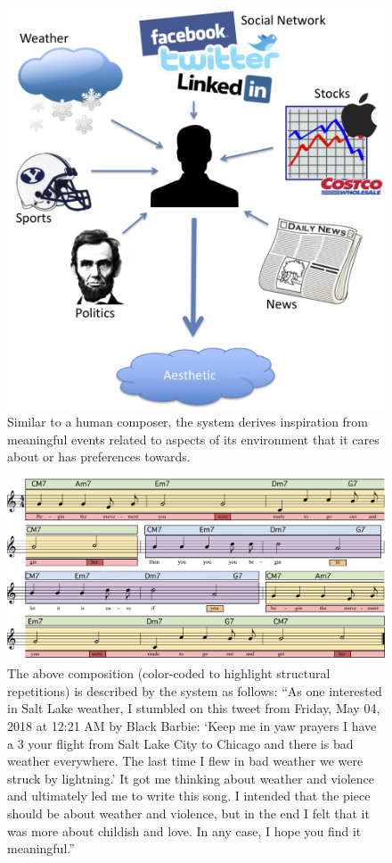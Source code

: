 \documentclass[letterpaper]{article}
\begin{document}
\begin{figure}[b!]
	\centering
	\includegraphics[width=.6\linewidth]{InspiringSources}
	\caption{\label{fig:inspiration} Similar to a human composer, the system derives inspiration from meaningful events related to aspects of its environment that it cares about or has preferences towards.}
\end{figure}

\begin{figure}[t!]
	\centering
	\includegraphics[width=.8\linewidth]{Song}
	\caption{\label{fig:song} The above composition (color-coded to highlight structural repetitions) is described by the system as follows: ``As one interested in Salt Lake weather, I stumbled on this tweet from Friday, May 04, 2018 at 12:21 AM by Black Barbie: `Keep me in yaw prayers I have a 3 your flight from Salt Lake City to Chicago and there is bad weather everywhere. The last time I flew in bad weather we were struck by lightning.' It got me thinking about weather and violence and ultimately led me to write this song. I intended that the piece should be about weather and violence, but in the end I felt that it was more about childish and love. In any case, I hope you find it meaningful.''}
\end{figure}
\end{document}
